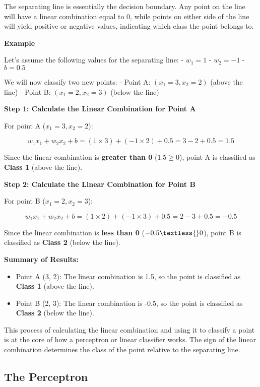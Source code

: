 \documentclass[11pt]{article}
\providecommand{\tightlist}{%
      \setlength{\itemsep}{0pt}\setlength{\parskip}{0pt}}
\begin{document}
The separating line is essentially the decision boundary. Any point on
the line will have a linear combination equal to 0, while points on
either side of the line will yield positive or negative values,
indicating which class the point belongs to.

\textbf{Example}

Let's assume the following values for the separating line: - $ w_1 = 1
$ - $ w_2 = -1 $ - $ b = 0.5 $

We will now classify two new points: - Point A: $ (x_1 = 3, x_2 = 2)
$ (above the line) - Point B: $ (x_1 = 2, x_2 = 3) $ (below the
line)

\textbf{Step 1: Calculate the Linear Combination for Point A}

For point A ($ x_1 = 3, x_2 = 2 $):

$$
w_1 x_1 + w_2 x_2 + b = (1 \times 3) + (-1 \times 2) + 0.5 = 3 - 2 + 0.5 = 1.5
$$

Since the linear combination is \textbf{greater than 0} ($ 1.5 \geq 0
$), point A is classified as \textbf{Class 1} (above the line).

\textbf{Step 2: Calculate the Linear Combination for Point B}

For point B ($ x_1 = 2, x_2 = 3 $):

$$
w_1 x_1 + w_2 x_2 + b = (1 \times 2) + (-1 \times 3) + 0.5 = 2 - 3 + 0.5 = -0.5
$$

Since the linear combination is \textbf{less than 0} ($ -0.5
\textless{} 0 $), point B is classified as \textbf{Class 2} (below the
line).

\textbf{Summary of Results:}

\begin{itemize}
\tightlist
\item
  Point A (3, 2): The linear combination is 1.5, so the point is
  classified as \textbf{Class 1} (above the line).
\item
  Point B (2, 3): The linear combination is -0.5, so the point is
  classified as \textbf{Class 2} (below the line).
\end{itemize}

This process of calculating the linear combination and using it to
classify a point is at the core of how a perceptron or linear classifier
works. The sign of the linear combination determines the class of the
point relative to the separating line.

    \subsection{The Perceptron}\label{the-perceptron}
\end{document}
